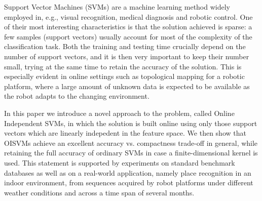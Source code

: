 Support Vector Machines (SVMs) are a machine learning method widely
employed in, e.g., visual recognition, medical diagnosis and robotic
control. One of their most interesting characteristics is that the
solution achieved is sparse: a few samples (support vectors) usually
account for most of the complexity of the classification task. Both
the training and testing time crucially depend on the number of
support vectors, and it is then very important to keep their number
small, trying at the same time to retain the accuracy of the
solution. This is especially evident in online settings such as
topological mapping for a robotic platform, where a large amount of
unknown data is expected to be available as the robot adapts to the
changing environment.

In this paper we introduce a novel approach to the problem, called
Online Independent SVMs, in which the solution is built online using
only those support vectors which are linearly indepedent in the
feature space. We then show that OISVMs achieve an excellent accuracy
vs. compactness trade-off in general, while retaining the full
accuracy of ordinary SVMs in case a finite-dimensional kernel is
used. This statement is supported by experiments on standard benchmark
databases as well as on a real-world application, namely place
recognition in an indoor environment, from sequences acquired by robot
platforms under different weather conditions and across a time span of
several months.
